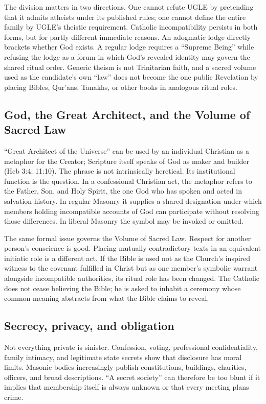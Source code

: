 The division matters in two directions. One cannot refute UGLE by pretending that it admits atheists under its published rules; one cannot define the entire family by UGLE's theistic requirement. Catholic incompatibility persists in both forms, but for partly different immediate reasons. An adogmatic lodge directly brackets whether God exists. A regular lodge requires a “Supreme Being” while refusing the lodge as a forum in which God's revealed identity may govern the shared ritual order. Generic theism is not Trinitarian faith, and a sacred volume used as the candidate's own “law” does not become the one public Revelation by placing Bibles, Qur'ans, Tanakhs, or other books in analogous ritual roles.

\subsection{God, the Great Architect, and the Volume of Sacred Law}

“Great Architect of the Universe” can be used by an individual Christian as a metaphor for the Creator; Scripture itself speaks of God as maker and builder (Heb 3:4; 11:10). The phrase is not intrinsically heretical. Its institutional function is the question. In a confessional Christian act, the metaphor refers to the Father, Son, and Holy Spirit, the one God who has spoken and acted in salvation history. In regular Masonry it supplies a shared designation under which members holding incompatible accounts of God can participate without resolving those differences. In liberal Masonry the symbol may be invoked or omitted.

The same formal issue governs the Volume of Sacred Law. Respect for another person's conscience is good. Placing mutually contradictory texts in an equivalent initiatic role is a different act. If the Bible is used not as the Church's inspired witness to the covenant fulfilled in Christ but as one member's symbolic warrant alongside incompatible authorities, its ritual role has been changed. The Catholic does not cease believing the Bible; he is asked to inhabit a ceremony whose common meaning abstracts from what the Bible claims to reveal.

\subsection{Secrecy, privacy, and obligation}

Not everything private is sinister. Confession, voting, professional confidentiality, family intimacy, and legitimate state secrets show that disclosure has moral limits. Masonic bodies increasingly publish constitutions, buildings, charities, officers, and broad descriptions. “A secret society” can therefore be too blunt if it implies that membership itself is always unknown or that every meeting plans crime.

